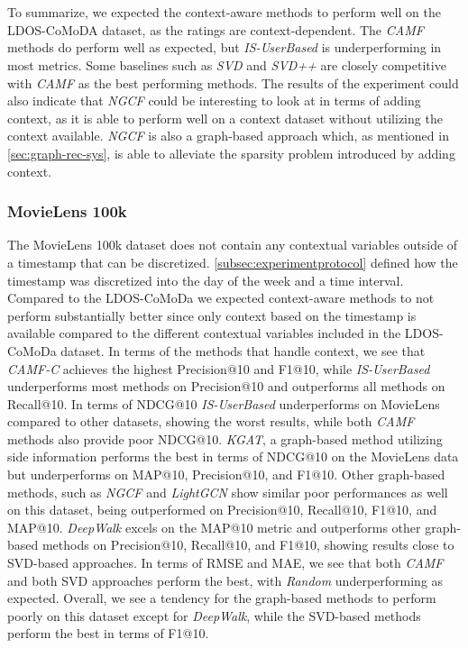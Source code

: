 \\\\
To summarize, we expected the context-aware methods to perform well on the LDOS-CoMoDA dataset, as the ratings are context-dependent. 
The \textit{CAMF} methods do perform well as expected, but \textit{IS-UserBased} is underperforming in most metrics.
Some baselines such as \textit{SVD} and \textit{SVD++} are closely competitive with \textit{CAMF} as the best performing methods.
The results of the experiment could also indicate that \textit{NGCF} could be interesting to look at in terms of adding context, as it is able to perform well on a context dataset without utilizing the context available. 
\textit{NGCF} is also a graph-based approach which, as mentioned in \autoref{sec:graph-rec-sys}, is able to alleviate the sparsity problem introduced by adding context.

\subsubsection{MovieLens 100k}
The MovieLens 100k dataset does not contain any contextual variables outside of a timestamp that can be discretized.
\autoref{subsec:experimentprotocol} defined how the timestamp was discretized into the day of the week and a time interval.
Compared to the LDOS-CoMoDa we expected context-aware methods to not perform substantially better since only context based on the timestamp is available compared to the different contextual variables included in the LDOS-CoMoDa dataset. 
In terms of the methods that handle context, we see that \textit{CAMF-C} achieves the highest Precision@10 and F1@10, while \textit{IS-UserBased} underperforms most methods on Precision@10 and outperforms all methods on Recall@10.
In terms of NDCG@10 \textit{IS-UserBased} underperforms on MovieLens compared to other datasets, showing the worst results, while both \textit{CAMF} methods also provide poor NDCG@10.
\textit{KGAT}, a graph-based method utilizing side information performs the best in terms of NDCG@10 on the MovieLens data but underperforms on MAP@10, Precision@10, and F1@10.
Other graph-based methods, such as \textit{NGCF} and \textit{LightGCN} show similar poor performances as well on this dataset, being outperformed on Precision@10, Recall@10, F1@10, and MAP@10.
\textit{DeepWalk} excels on the MAP@10 metric and outperforms other graph-based methods on Precision@10, Recall@10, and F1@10, showing results close to SVD-based approaches.
In terms of RMSE and MAE, we see that both \textit{CAMF} and both SVD approaches perform the best, with \textit{Random} underperforming as expected.
Overall, we see a tendency for the graph-based methods to perform poorly on this dataset except for \textit{DeepWalk}, while the SVD-based methods perform the best in terms of F1@10.

